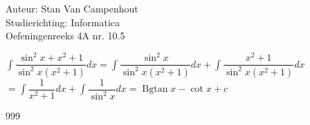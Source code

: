 \documentclass[a4paper]{article}
\begin{document}
  
\noindent \large Auteur: Stan Van Campenhout \\
\noindent \large Studierichting:  Informatica\\
\noindent \large Oefeningenreeks 4A nr. 10.5\\

\medskip

\normalsize

$ \displaystyle\int\dfrac{\sin^2x + x^2 + 1}{\sin^2x\left(x^2 + 1\right)} dx = \displaystyle\int\dfrac{\sin^2x}{\sin^2x\left(x^2 + 1\right)} dx 
+ \displaystyle\int\dfrac{x^2 + 1}{\sin^2x\left(x^2 + 1\right)} dx $\\

$ =  \displaystyle\int\dfrac{1}{x^2 + 1} dx + \displaystyle\int\dfrac{1}{\sin^2x} dx = \operatorname{Bgtan}x - \cot x + c $\\

\begin{thebibliography}{999}
\end{thebibliography}
\end{document}
